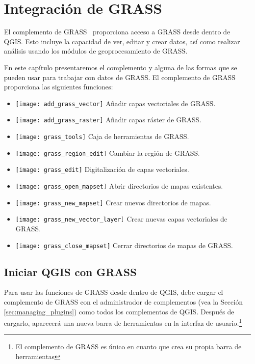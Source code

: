 
\section{Integración de GRASS}\label{sec:grass}

El complemento de GRASS~\cite{GRASSweb} proporciona acceso a GRASS desde dentro de QGIS. Esto incluye la capacidad de ver, editar y crear datos, así como realizar análisis usando los módulos de geoprocesamiento de GRASS.

En este capítulo presentaremos el complemento y alguna de las formas que se pueden usar para trabajar con datos de GRASS. El complemento de GRASS proporciona las siguientes funciones:
 
\begin{itemize}
\item \texttt{[image: add\_grass\_vector]} Añadir capas vectoriales de GRASS.
\item \texttt{[image: add\_grass\_raster]} Añadir capas ráster de GRASS.
\item \texttt{[image: grass\_tools]} Caja de herramientas de GRASS.
\item \texttt{[image: grass\_region\_edit]} Cambiar la región de GRASS.
\item \texttt{[image: grass\_edit]} Digitalización de capas vectoriales.
\item \texttt{[image: grass\_open\_mapset]} Abrir directorios de mapas existentes.
\item \texttt{[image: grass\_new\_mapset]} Crear nuevos directorios de mapas.
\item \texttt{[image: grass\_new\_vector\_layer]} Crear nuevas capas vectoriales de GRASS.
\item \texttt{[image: grass\_close\_mapset]} Cerrar directorios de mapas de GRASS.
\end{itemize}

\subsection{Iniciar QGIS con GRASS}\label{sec:starting_grass}

Para usar las funciones de GRASS desde dentro de QGIS, debe cargar el complemento de GRASS con el administrador de complementos (vea la Sección \ref{sec:managing_plugins}) como todos los complementos de QGIS. Después de cargarlo, aparecerá una nueva barra de herramientas en la interfaz de usuario.\footnote{El complemento de GRASS es único en cuanto que crea su propia barra de herramientas}

